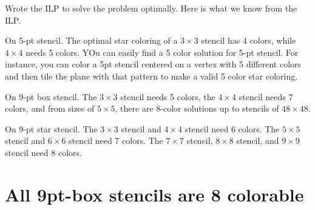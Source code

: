 \documentclass{article}
\begin{document}
Wrote the ILP to solve the problem optimally. Here is what we know
from the ILP.

On 5-pt stencil. The optimal star coloring of a $3 \times 3$ stencil
has 4 colors, while $4 \times 4$ needs 5 colors. YOu can easily find a
5 color solution for 5-pt stencil. For instance, you can color a 5pt stencil
centered on a vertex with 5 different colors and then tile the plane
with that pattern to make a valid 5 color star coloring.

On 9-pt box stencil. The $3 \times 3$ stencil needs 5 colors, the $4
\times 4$ stencil needs 7 colors, and from sizes of $5 \times 5$,
there are 8-color solutions up to stencils of $48 \times 48$.

On 9-pt star stencil. The $3 \times 3$ stencil and $4 \times 4$
stencil need 6 colors. The $5 \times 5$ stencil and $6 \times 6$
stencil need 7 colors. The $7 \times 7$ stencil, $8 \times 8$ stencil,
and $9 \times 9$ stencil need 8 colors.

\section{All 9pt-box stencils are 8 colorable}
\end{document}

